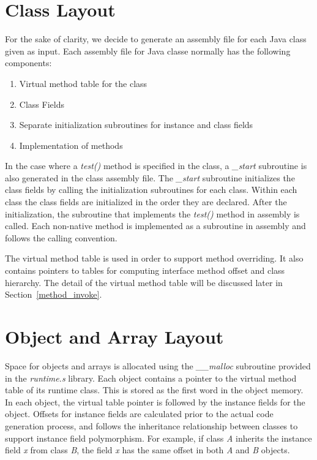 \documentclass[a4paper, notitlepage]{report}
\begin{document}
\section{Class Layout}

For the sake of clarity, we decide to generate an assembly file for each Java class given as input. Each assembly file for Java classe normally has the following components:
\begin{enumerate}
\item Virtual method table for the class
\item Class Fields
\item Separate initialization subroutines for instance and class fields
\item Implementation of methods
\end{enumerate}

In the case where a \emph{test()} method is specified in the class, a \emph{\_start} subroutine is also generated in the class assembly file. The \emph{\_start} subroutine initializes the class fields by calling the initialization subroutines for each class. Within each class the class fields are initialized in the order they are declared. After the initialization, the subroutine that implements the \emph{test()} method in assembly is called. Each non-native method is implemented as a subroutine in assembly and follows the calling convention.

The virtual method table is used in order to support method overriding. It also contains pointers to tables for computing interface method offset and class hierarchy. The detail of the virtual method table will be discussed later in Section~\ref{method_invoke}. 

\section{Object and Array Layout}

Space for objects and arrays is allocated using the \emph{\_\_malloc} subroutine provided in the \emph{runtime.s} library. Each object contains a pointer to the virtual method table of its runtime class. This is stored as the first word in the object memory. In each object, the virtual table pointer is followed by the instance fields for the object. Offsets for instance fields are calculated prior to the actual code generation process, and follows the inheritance relationship between classes to support instance field polymorphism. For example, if class \emph{A} inherits the instance field \emph{x} from class \emph{B}, the field \emph{x} has the same offset in both \emph{A} and \emph{B} objects. 
\end{document}
